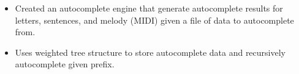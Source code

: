 \divider


\begin{itemize}

	\item Created an autocomplete engine that generate autocomplete results for letters, sentences, and melody (MIDI) given a file of data to autocomplete from.

	\item Uses weighted tree structure to store autocomplete data and recursively autocomplete given prefix.

\end{itemize}


